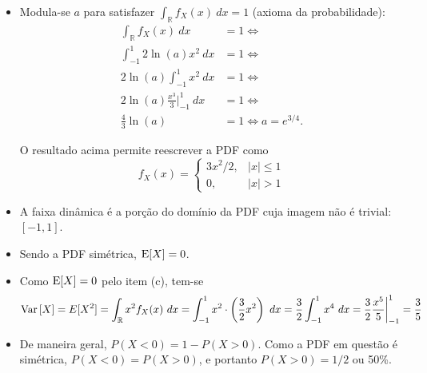 \respostas
\begin{itemize}
    \item [a)]
    Modula-se $a$ para satisfazer $\int_\mathbb{R} f_X(x)\ dx = 1$ (axioma da probabilidade):
    \begin{align}
        \int_\mathbb{R} f_X(x) \ dx &= 1 \iff \\
        \int_{-1}^1 2\ln(a) x^2 \ dx &= 1 \iff \\
        2\ln(a) \int_{-1}^1 x^2 \ dx &= 1 \iff \\
        2\ln(a) \frac{x^3}{3}\bigg|_{-1}^1 \ dx &= 1 \iff \\
        \frac{4}{3} \ln(a) &= 1 \iff 
        a = e^{3/4}.
    \end{align}

    O resultado acima permite reescrever a PDF como
    \begin{equation}
        f_X(x) = 
        \begin{cases}
            3x^2/2, & |x| \leq 1 \\
            0,      & |x| > 1
        \end{cases}
    \end{equation}
    
    \item [b)]
    A faixa dinâmica é a porção do domínio da PDF cuja imagem não é trivial: $[-1, 1]$.
    
    \item [c)]
    Sendo a PDF simétrica, $\mathrm{E}\!\left[X\right]=0$.
    
    \item [d)]
    Como $\mathrm{E}\!\left[X\right]=0$ pelo item (c), tem-se
    \begin{equation}
        \mathrm{Var}\left[X\right] 
        = E[X^2]
        = \int_\mathbb{R} x^2 f_X(x) \ dx
        = \int_{-1}^1 x^2 \cdot \left(\frac{3}{2}x^2\right) \ dx
        = \frac{3}{2} \int_{-1}^1 x^4 \ dx
        = \frac{3}{2} \frac{x^5}{5}\bigg|_{-1}^1
        = \frac{3}{5}
    \end{equation}
    
    \item [e)]
    De maneira geral, $P(X<0) = 1 - P(X>0)$.
    Como a PDF em questão é simétrica, $P(X<0) = P(X>0)$, 
    e portanto $P(X>0) = 1/2$ ou 50\%.
\end{itemize}